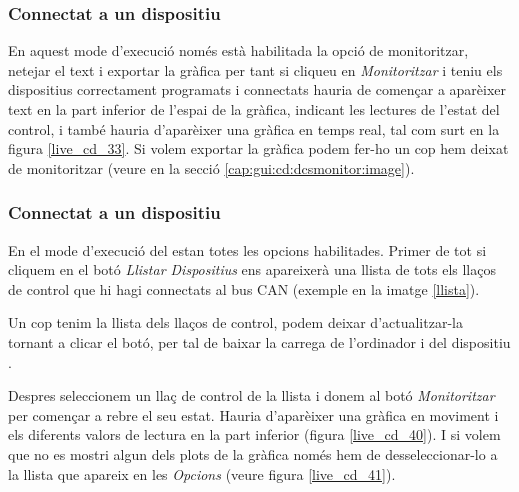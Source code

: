 \subsubsection{Connectat a un dispositiu \SensorActuador}\label{cap:gui:cd:dcsmonitor:sensor}

En aquest mode d'execució només està habilitada la opció de monitoritzar, netejar el text i exportar la gràfica per tant si cliqueu en \emph{Monitoritzar} i teniu els dispositius correctament programats i connectats hauria de començar a aparèixer text en la part inferior de l'espai de la gràfica, indicant les lectures de l'estat del control, i també hauria d'aparèixer una gràfica en temps real, tal com surt en la figura \ref{live_cd_33}.
Si volem exportar la gràfica podem fer-ho un cop hem deixat de monitoritzar (veure en la secció \ref{cap:gui:cd:dcsmonitor:image}).


\clearpage

\subsubsection{Connectat a un dispositiu \Monitor}\label{cap:gui:cd:dcsmonitor:monitor}

En el mode d'execució del \Monitor estan totes les opcions habilitades. Primer de tot si cliquem en el botó \emph{Llistar Dispositius} ens apareixerà una llista de tots els llaços de control que hi hagi connectats al bus CAN (exemple en la imatge \ref{llista}).


Un cop tenim la llista dels llaços de control, podem deixar d'actualitzar-la tornant a clicar el botó, per tal de baixar la carrega de l'ordinador i del dispositiu \Monitor.

Despres seleccionem un llaç de control de la llista i donem al botó \emph{Monitoritzar} per començar a rebre el seu estat. Hauria d'aparèixer una gràfica en moviment i els diferents valors de lectura en la part inferior (figura \ref{live_cd_40}).
I si volem que no es mostri algun dels plots de la gràfica només hem de desseleccionar-lo a la llista que apareix en les \emph{Opcions} (veure figura \ref{live_cd_41}).

